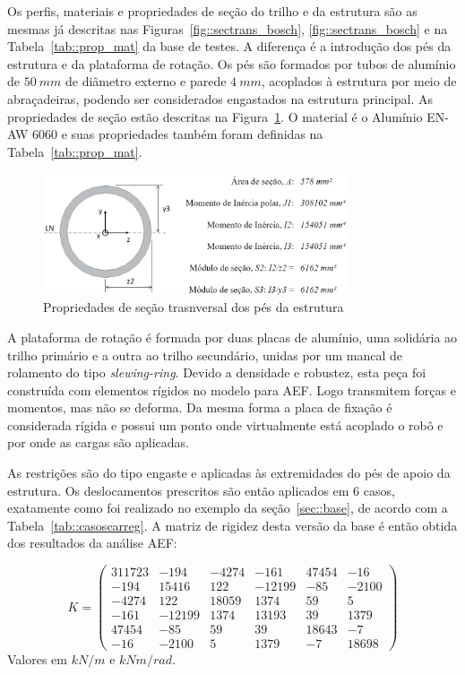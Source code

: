 Os perfis, materiais e propriedades de seção do trilho e da estrutura são as
mesmas já descritas nas Figuras~\ref{fig::sectrans_bosch},
\ref{fig::sectrans_bosch} e na Tabela~\ref{tab::prop_mat} da base de testes. A
diferença é a introdução dos pés da estrutura e da plataforma de rotação. Os pés
são formados por tubos de alumínio de $50~mm$ de diâmetro externo e parede
$4~mm$, acoplados à estrutura por meio de abraçadeiras, podendo ser
considerados engastados na estrutura principal.
As propriedades de seção estão descritas na Figura~\ref{fig::sectrans_pes}. O
material é o Alumínio EN-AW 6060 e suas propriedades também foram definidas na
Tabela~\ref{tab::prop_mat}.

\begin{figure}[h]
	\centering 
 	\includegraphics[width=0.80\textwidth]{figs/sectrans_pes}
 	\caption{Propriedades de seção trasnversal dos pés da estrutura}
 	\label{fig::sectrans_pes}
\end{figure}

A plataforma de rotação é formada por duas placas de alumínio, uma solidária ao
trilho primário e a outra ao trilho secundário, unidas por um mancal de
rolamento do tipo \textit{slewing-ring}. Devido a densidade e robustez, esta peça foi
construída com elementos rígidos no modelo para AEF. Logo transmitem forças e
momentos, mas não se deforma. Da mesma forma a placa de fixação é considerada
rígida e possui um ponto onde virtualmente está acoplado o robô e por onde as
cargas são aplicadas.

As restrições são do tipo engaste e aplicadas às extremidades do pés de apoio da
estrutura. Os deslocamentos prescritos são então aplicados em 6 casos,
exatamente como foi realizado no exemplo da seção~\ref{sec::base}, de acordo com a
Tabela~\ref{tab::casoscarreg}. A matriz de rigidez desta versão da base é então
obtida dos resultados da análise AEF:

%
\begin{equation}
	K = 
\begin{pmatrix}
311723	&	-194	&	-4274	&	-161	&	47454	&	-16 \\
-194	&	15416	&	122	&	-12199	&	-85	&	-2100 \\
-4274	&	122	&	18059	&	1374	&	59	&	5 \\
-161	&	-12199	&	1374	&	13193	&	39	&	1379 \\
47454	&	-85	&	59	&	39	&	18643	&	-7 \\
-16	&	-2100	&	5	&	1379	&	-7	&	18698
\end{pmatrix}
\end{equation}
%
Valores em $kN/m$ e $kNm/rad$.

